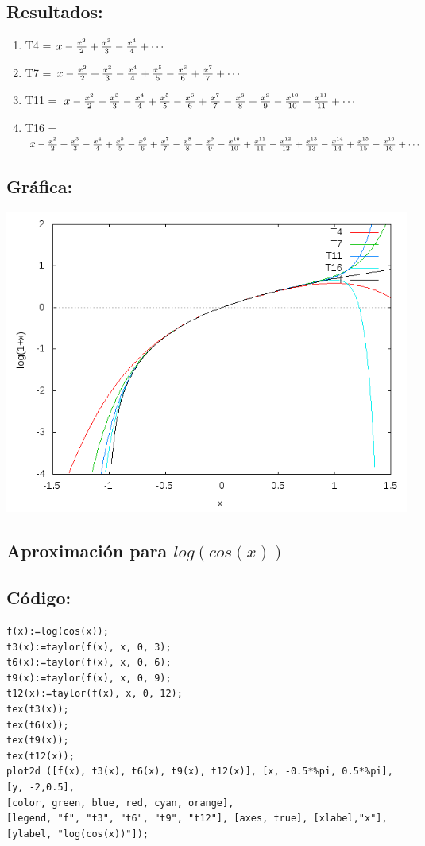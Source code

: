 \documentclass[10pt]{article}
\begin{document}
\subsection*{Resultados:}
\begin{enumerate}
\item T4 = $x-{{x^2}\over{2}}+{{x^3}\over{3}}-{{x^4}\over{4}}+\cdots $
\item T7 = $x-{{x^2}\over{2}}+{{x^3}\over{3}}-{{x^4}\over{4}}+{{x^5}\over{5}}-
 {{x^6}\over{6}}+{{x^7}\over{7}}+\cdots $
\item T11 = $x-{{x^2}\over{2}}+{{x^3}\over{3}}-{{x^4}\over{4}}+{{x^5}\over{5}}-
 {{x^6}\over{6}}+{{x^7}\over{7}}-{{x^8}\over{8}}+{{x^9}\over{9}}-{{x
 ^{10}}\over{10}}+{{x^{11}}\over{11}}+\cdots $
\item T16 = $x-{{x^2}\over{2}}+{{x^3}\over{3}}-{{x^4}\over{4}}+{{x^5}\over{5}}-
 {{x^6}\over{6}}+{{x^7}\over{7}}-{{x^8}\over{8}}+{{x^9}\over{9}}-{{x
 ^{10}}\over{10}}+{{x^{11}}\over{11}}-{{x^{12}}\over{12}}+{{x^{13}
 }\over{13}}-{{x^{14}}\over{14}}+{{x^{15}}\over{15}}-{{x^{16}}\over{
 16}}+\cdots $
\end{enumerate}
\subsection*{Gráfica:}
\includegraphics[scale=0.6]{plot2}

\newpage
\subsection{Aproximación para $log(cos(x))$}

\subsection*{Código:}
\begin{verbatim}
f(x):=log(cos(x));
t3(x):=taylor(f(x), x, 0, 3);
t6(x):=taylor(f(x), x, 0, 6);
t9(x):=taylor(f(x), x, 0, 9);
t12(x):=taylor(f(x), x, 0, 12);
tex(t3(x));
tex(t6(x));
tex(t9(x));	
tex(t12(x));
plot2d ([f(x), t3(x), t6(x), t9(x), t12(x)], [x, -0.5*%pi, 0.5*%pi], [y, -2,0.5],
[color, green, blue, red, cyan, orange], 
[legend, "f", "t3", "t6", "t9", "t12"], [axes, true], [xlabel,"x"], [ylabel, "log(cos(x))"]);
\end{verbatim}
\end{document}
